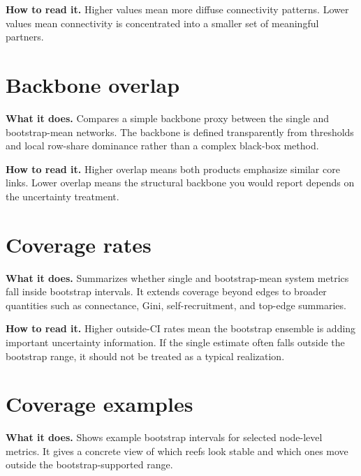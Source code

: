 \documentclass[11pt,a4paper]{article}
\begin{document}
\textbf{How to read it.} Higher values mean more diffuse connectivity patterns.
Lower values mean connectivity is concentrated into a smaller set of meaningful partners.

\section{Backbone overlap}

\textbf{What it does.} Compares a simple backbone proxy between the single and bootstrap-mean networks.
The backbone is defined transparently from thresholds and local row-share dominance rather than a complex black-box method.


\textbf{How to read it.} Higher overlap means both products emphasize similar core links.
Lower overlap means the structural backbone you would report depends on the uncertainty treatment.

\section{Coverage rates}

\textbf{What it does.} Summarizes whether single and bootstrap-mean system metrics fall inside bootstrap intervals.
It extends coverage beyond edges to broader quantities such as connectance, Gini, self-recruitment, and top-edge summaries.


\textbf{How to read it.} Higher outside-CI rates mean the bootstrap ensemble is adding important uncertainty information.
If the single estimate often falls outside the bootstrap range, it should not be treated as a typical realization.

\section{Coverage examples}

\textbf{What it does.} Shows example bootstrap intervals for selected node-level metrics.
It gives a concrete view of which reefs look stable and which ones move outside the bootstrap-supported range.

\end{document}
